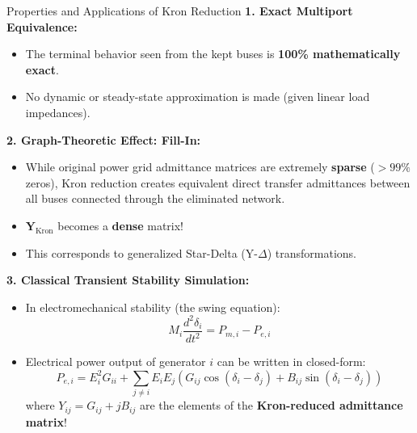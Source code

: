 \begin{frame}[allowframebreaks]{Properties and Applications of Kron Reduction}
    \textbf{1. Exact Multiport Equivalence:}
    \begin{itemize}
        \item The terminal behavior seen from the kept buses is \textbf{100\% mathematically exact}.
        \item No dynamic or steady-state approximation is made (given linear load impedances).
    \end{itemize}

    \textbf{2. Graph-Theoretic Effect: Fill-In:}
    \begin{itemize}
        \item While original power grid admittance matrices are extremely \textbf{sparse} ($>99\%$ zeros), Kron reduction creates equivalent direct transfer admittances between all buses connected through the eliminated network.
        \item $\mathbf{Y}_{\text{Kron}}$ becomes a \alert{\textbf{dense}} matrix!
        \item This corresponds to generalized Star-Delta ($\text{Y}\text{-}\Delta$) transformations.
    \end{itemize}

    \textbf{3. Classical Transient Stability Simulation:}
    \begin{itemize}
        \item In electromechanical stability (the swing equation):
        \begin{equation}
            M_i \frac{d^2\delta_i}{dt^2} = P_{m,i} - P_{e,i}
        \end{equation}
        \item Electrical power output of generator $i$ can be written in closed-form:
        \begin{equation}
            P_{e,i} = E_i^2 G_{ii} + \sum_{j \neq i} E_i E_j \left(G_{ij} \cos(\delta_i - \delta_j) + B_{ij} \sin(\delta_i - \delta_j)\right)
        \end{equation}
        where $Y_{ij} = G_{ij} + j B_{ij}$ are the elements of the \textbf{Kron-reduced admittance matrix}!
    \end{itemize}
\end{frame}

